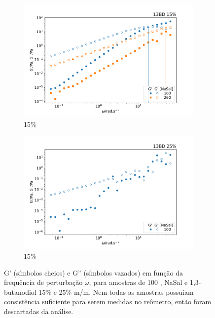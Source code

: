	\begin{figure}[h]
		\begin{subfigure}[t]{0.5\textwidth}
			\centering
			\includegraphics[width=\textwidth]{imagens/reologia/oscilatorio_13bd15p}
			\caption{\BD{} 15\%}
			\label{fig:oscilatorio_13bd_15p}
		\end{subfigure} %
		\begin{subfigure}[t]{0.5\textwidth}
			\centering
			\includegraphics[width=\textwidth]{imagens/reologia/oscilatorio_13bd25p}
			\caption{\BD{} 15\%}
			\label{fig:oscilatorio_13bd_25p}
		\end{subfigure} %
		\caption{G' (símbolos cheios) e G'' (símbolos vazados) em função da frequência de perturbação \(\omega\), para amostras de \CTAB{} 100 \mM{}, NaSal e 1,3-butanodiol 15\% e 25\% m/m. Nem todas as amostras possuíam consistência suficiente para serem medidas no reômetro, então foram descartadas da análise.}
		\label{fig:oscilatorio_13bd}
	\end{figure} 	

